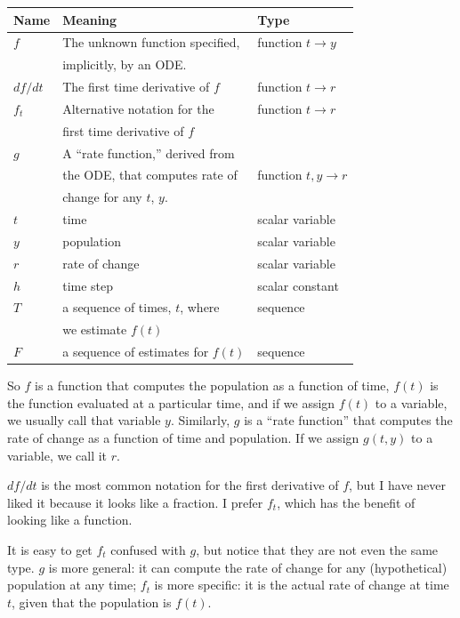 \documentclass{book}
\begin{document}
\begin{tabular}{|l|l|l|}
\hline
Name   & Meaning       & Type \\
\hline \hline
$f$   & The unknown function specified,  & function $t \to y$ \\
    & implicitly, by an ODE.       &  \\\hline

$df/dt$ & The first time derivative of $f$ & function $t \to r$ \\ \hline

$f_t$ & Alternative notation for the  & function $t \to r$ \\ 
    & first time derivative of $f$  & \\ \hline


$g$   & A ``rate function,'' derived from   & \\
    & the ODE, that computes rate of   & function $t, y \to r$ \\
    & change for any $t$, $y$.      &  \\\hline

$t$   & time      & scalar variable \\\hline
$y$   & population      & scalar variable \\\hline
$r$   & rate of change      & scalar variable \\\hline

$h$   & time step      & scalar constant \\\hline
$T$   & a sequence of times, $t$, where  & sequence \\
       & we estimate $f(t)$  &      \\\hline
$F$   & a sequence of estimates for $f(t)$ & sequence \\
\hline
\end{tabular}

So $f$ is a function that computes the population as a function of
time, $f(t)$ is the function evaluated at a particular time, and if we
assign $f(t)$ to a variable, we usually call that variable $y$.
Similarly, $g$ is a ``rate function'' that computes the rate of change as a
function of time and population. If we assign $g(t,y)$ to a variable,
we call it $r$.

$df/dt$ is the most common notation for the first derivative of $f$,
but I have never liked it because it looks like a fraction. I
prefer $f_t$, which has the benefit of looking like a function.

It is easy to get $f_t$ confused with $g$, but notice that they are
not even the same type. $g$ is more general: it can compute the rate
of change for any (hypothetical) population at any time; $f_t$
is more specific: it is the actual rate of change at time $t$, given
that the population is $f(t)$.
\end{document}
